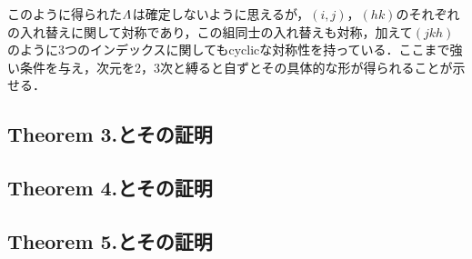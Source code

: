 \documentclass[main]{subfiles}
\begin{document}
このように得られた\(\varLambda^{}\)は確定しないように思えるが，\((i,j)\)，\((hk)\)のそれぞれの入れ替えに関して対称であり，この組同士の入れ替えも対称，加えて\((jkh)\)のように3つのインデックスに関してもcyclicな対称性を持っている．ここまで強い条件を与え，次元を2，3次と縛ると自ずとその具体的な形が得られることが示せる．

\subsection{Theorem 3.とその証明}

\subsection{Theorem 4.とその証明}

\subsection{Theorem 5.とその証明}
\end{document}
